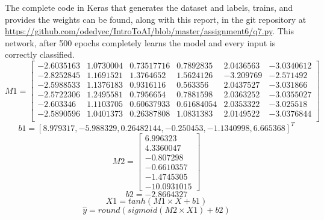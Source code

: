 \documentclass{article}                     %
\begin{document}
	The complete code in Keras that generates the dataset and labels, trains, and provides the weights can be found, along with this report, in the git repository at \url{https://github.com/odedyec/IntroToAI/blob/master/assignment6/q7.py}. This network, after 500 epochs completely learns the model and every input is correctly classified.
	\begin{equation}\label{eq:m1}
	M1 = \left[ \begin{array}{cccccc}
		-2.6035163 & 1.0730004 & 0.73517716 &  0.7892835 & 2.0436563 & -3.0340612 \\
		-2.8252845 & 1.1691521 & 1.3764652 & 1.5624126 & -3.209769 &	-2.571492  \\
		-2.5988533 & 1.1376183 & 0.9316116 & 0.563356  & 2.0437527 & -3.031866  \\
		-2.5722306 & 1.2495581 & 0.7956654 & 0.7881598 & 2.0363252 &	-3.0355027 \\
		-2.603346  & 1.1103705 & 0.60637933 & 0.61684054 & 2.0353322 & -3.025518 \\
		-2.5890596 & 1.0401373 & 0.26387808 & 1.0831383 & 2.0149522 &  -3.0376844 \\
	\end{array} \right]
	\end{equation}
	\begin{equation}\label{eq:b1}
	b1 = \left[8.979317  , -5.988329  ,  0.26482144, -0.250453  , -1.1340998 ,
	6.665368 \right]^T
	\end{equation}
	\begin{equation}\label{eq:m2}
	M2 = \left[\begin{array}{c}
	6.996323 \\
	  4.3360047\\
	 -0.807298\\
	 -0.6610357\\
	 -1.4745305\\
	-10.0931015
	\end{array}\right]
	\end{equation}
	\begin{equation}\label{eq:b2}
	b2 = -2.8664327
	\end{equation}
	\begin{equation}\label{eq:l1}
	X1 = tanh(M1 \times X + b1)
	\end{equation}
	\begin{equation}\label{eq:l2}
	\hat{y} = round(sigmoid(M2 \times X1) + b2)
	\end{equation}
\end{document}
